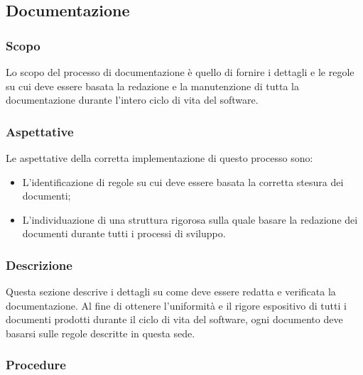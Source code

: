 \documentclass[../norme-di-progetto.tex]{subfiles}
\begin{document}
\subsection{Documentazione}
\subsubsection{Scopo}
Lo scopo del processo di documentazione è quello di fornire i dettagli e le regole su cui deve essere basata la redazione e la manutenzione di tutta la documentazione durante l'intero ciclo di vita del software.

\subsubsection{Aspettative}
Le aspettative della corretta implementazione di questo processo sono:
\begin{itemize}
  \item L'identificazione di regole su cui deve essere basata la corretta stesura dei documenti;
  \item L'individuazione di una struttura rigorosa sulla quale basare la redazione dei documenti durante tutti i processi di sviluppo.
\end{itemize}

\subsubsection{Descrizione}
Questa sezione descrive i dettagli su come deve essere redatta e verificata la documentazione. Al fine di ottenere l'uniformità e il rigore espositivo di tutti i documenti prodotti durante il ciclo di vita del software, ogni documento deve basarsi sulle regole descritte in questa sede.

\subsubsection{Procedure}
\end{document}
